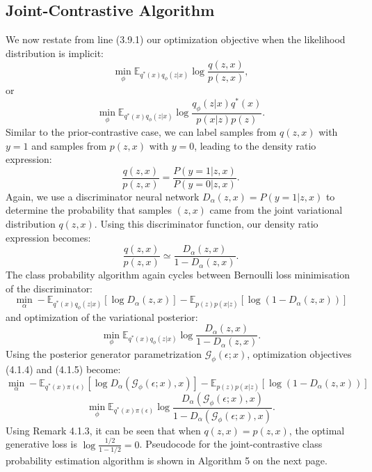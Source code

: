 \documentclass[honours,12pt]{unswthesis}
\numberwithin{equation}{section}
\theoremstyle{definition}
\begin{document}
\subsection{Joint-Contrastive Algorithm}
We now restate from line (3.9.1) our optimization objective when the likelihood distribution is implicit:
\[\min_\phi \mathbb{E}_{q^*(x)q_\phi(z|x)}\log \frac{q(z,x)}{p(z,x)},\]
or
\[\min_\phi \mathbb{E}_{q^*(x)q_\phi(z|x)}\log \frac{q_\phi(z|x)q^*(x)}{p(x|z)p(z)}.\]
Similar to the prior-contrastive case, we can label samples from $q(z,x)$ with $y=1$ and samples from $p(z,x)$ with $y=0$, leading to the density ratio expression:
\[\frac{q(z,x)}{p(z,x)}=\frac{P(y=1|z,x)}{P(y=0|z,x)}.\]
Again, we use a discriminator neural network $D_\alpha(z,x)=P(y=1|z,x)$ to determine the probability that samples $(z,x)$ came from the joint variational distribution $q(z,x)$. Using this discriminator function, our density ratio expression becomes:
\[\frac{q(z,x)}{p(z,x)}\simeq\frac{D_\alpha(z,x)}{1-D_\alpha(z,x)}.\]
The class probability algorithm again cycles between Bernoulli loss minimisation of the discriminator:
\begin{equation}
\min_\alpha -\mathbb{E}_{q^*(x)q_\phi(z|x)}[\log D_\alpha(z,x)]-\mathbb{E}_{p(z)p(x|z)}[\log (1-D_\alpha(z,x))]
\end{equation}
and optimization of the variational posterior:
\begin{equation}
\min_\phi \mathbb{E}_{q^*(x)q_\phi(z|x)}\log\frac{D_\alpha(z,x)}{1-D_\alpha(z,x)}.
\end{equation}
Using the posterior generator parametrization $\mathcal{G}_\phi (\epsilon;x)$, optimization objectives (4.1.4) and (4.1.5) become:
\[\min_\alpha -\mathbb{E}_{q^*(x)\pi(\epsilon)}[\log D_\alpha(\mathcal{G}_\phi(\epsilon;x), x)]-\mathbb{E}_{p(z)p(x|z)}[\log (1-D_\alpha(z,x))]\]
\[\min_\phi \mathbb{E}_{q^*(x)\pi(\epsilon)}\log\frac{D_\alpha(\mathcal{G}_\phi(\epsilon;x),x)}{1-D_\alpha(\mathcal{G}_\phi(\epsilon;x),x)}.\]
Using Remark 4.1.3, it can be seen that when $q(z,x)=p(z,x)$, the optimal generative loss is $\log \frac{1/2}{1-1/2}=0$. Pseudocode for the joint-contrastive class probability estimation algorithm is shown in Algorithm 5 on the next page.
\newpage
\end{document}
